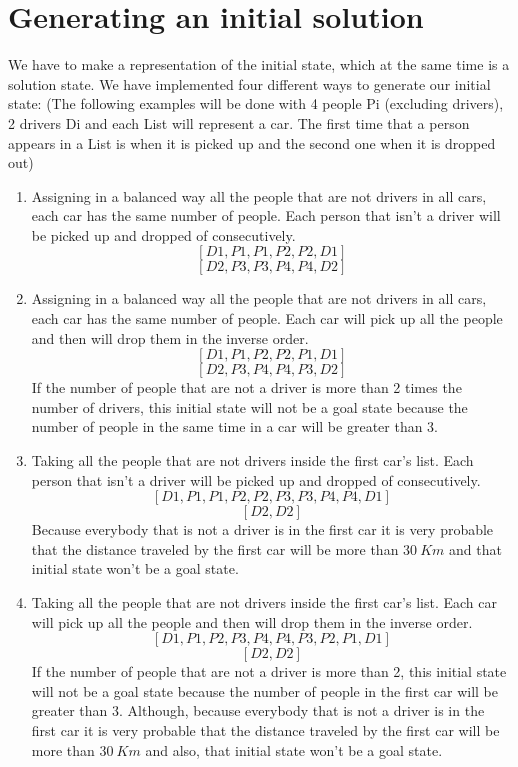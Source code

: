\documentclass[12]{article}
\begin{document}
\section{Generating an initial solution}
We have to make a representation of the initial state, which at the same time is a solution state. We have implemented four different ways to generate our initial state: (The following examples will be done with 4 people Pi (excluding drivers), 2 drivers Di and each List will represent a car. The first time that a person appears in a List is when it is picked up and the second one when it is dropped out)
\begin{enumerate}
\item Assigning in a balanced way all the people that are not drivers in all cars, each car has the same number of people. Each person that isn't a driver will be picked up and dropped of consecutively.
$$[D1,P1,P1,P2,P2,D1]$$
$$[D2,P3,P3,P4,P4,D2]$$
\item Assigning in a balanced way all the people that are not drivers in all cars, each car has the same number of people. Each car will pick up all the people and then will drop them in the inverse order.
$$[D1,P1,P2,P2,P1,D1]$$
$$[D2,P3,P4,P4,P3,D2]$$
If the number of people that are not a driver is more than 2 times the number of drivers, this initial state will not be a goal state because the number of people in the same time in a car will be greater than 3.
\item Taking all the people that are not drivers inside the first car's list. Each person that isn't a driver will be picked up and dropped of consecutively.
$$[D1,P1,P1,P2,P2,P3,P3,P4,P4,D1]$$
$$[D2,D2]$$
Because everybody that is not a driver is in the first car it is very probable that the distance traveled by the first car will be more than $30\ Km$ and that initial state won't be a goal state.
\item Taking all the people that are not drivers inside the first car's list. Each car will pick up all the people and then will drop them in the inverse order.
$$[D1,P1,P2,P3,P4,P4,P3,P2,P1,D1]$$
$$[D2,D2]$$
If the number of people that are not a driver is more than 2, this initial state will not be a goal state because the number of people in the first car will be greater than 3. Although, because everybody that is not a driver is in the first car it is very probable that the distance traveled by the first car will be more than $30\ Km$ and also, that initial state won't be a goal state.
\end{enumerate} 
\end{document}
